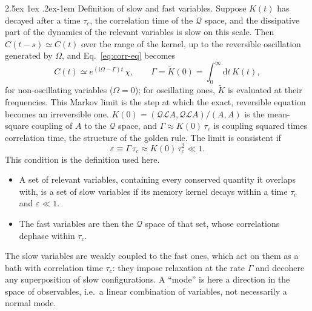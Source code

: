 \documentclass[10pt,a4paper]{article}
\makeatletter
\renewcommand{\paragraph}{\@startsection{paragraph}{4}{\z@}%
  {2.5ex \@plus 1ex \@minus .2ex}{-1em}%
  {\normalfont\fontsize{14pt}{17pt}\selectfont\bfseries}}
\newcommand{\dd}{\mathrm{d}}
\newcommand{\ii}{\mathrm{i}}
\newcommand{\sprod}[2]{\left(#1 , #2\right)}
\newcommand{\LL}{\mathcal{L}}
\newcommand{\QQ}{\mathcal{Q}}
\makeatother
\begin{document}
\paragraph{Definition of slow and fast variables.}
Suppose $ K(t) $ has decayed after a time $ \tau_c $, the correlation time of the $ \QQ $ space, and the dissipative part of the dynamics of the relevant variables is slow on this scale.
Then $ C(t-s) \simeq C(t) $ over the range of the kernel, up to the reversible oscillation generated by $ \Omega $, and Eq.~\eqref{eq:corr-eq} becomes
\begin{equation}
  C(t) \simeq e^{(\ii\Omega - \Gamma) t} \, \chi ,
  \qquad
  \Gamma = \tilde K(0) = \int_0^\infty \dd t \, K(t) ,
  \label{eq:markov}
\end{equation}
for non-oscillating variables ($ \Omega = 0 $); for oscillating ones, $ \tilde K $ is evaluated at their frequencies.
This Markov limit is the step at which the exact, reversible equation becomes an irreversible one.
$ K(0) = \sprod{\QQ\LL A}{\QQ\LL A}/\sprod{A}{A} $ is the mean-square coupling of $ A $ to the $ \QQ $ space, and $ \Gamma \approx K(0)\,\tau_c $ is coupling squared times correlation time, the structure of the golden rule.
The limit is consistent if
\begin{equation}
  \varepsilon \equiv \Gamma \, \tau_c \approx K(0) \, \tau_c^2 \ll 1 .
  \label{eq:markov-condition}
\end{equation}
This condition is the definition used here.
\begin{itemize}[leftmargin=1.5em]
\item A set of relevant variables, containing every conserved quantity it overlaps with, is a set of slow variables if its memory kernel decays within a time $ \tau_c $ and $ \varepsilon \ll 1 $.
\item The fast variables are then the $ \QQ $ space of that set, whose correlations dephase within $ \tau_c $.
\end{itemize}
The slow variables are weakly coupled to the fast ones, which act on them as a bath with correlation time $ \tau_c $: they impose relaxation at the rate $ \Gamma $ and decohere any superposition of slow configurations.
A ``mode'' is here a direction in the space of observables, i.e.\ a linear combination of variables, not necessarily a normal mode.
\end{document}

